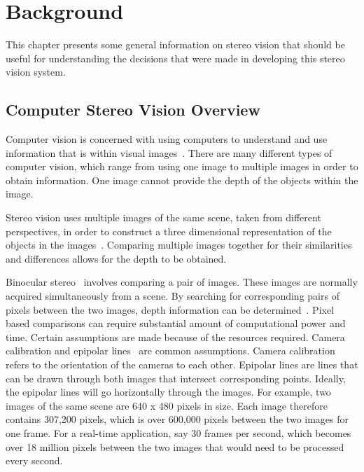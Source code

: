 \chapter{Background}
\label{bckgrnd}

This chapter presents some general information on stereo vision that should be useful for understanding the decisions that were made in developing this stereo vision system.

\section{Computer Stereo Vision Overview}

Computer vision is concerned with using computers to understand and use information that is within visual images~\cite{computerVision}. There are many different types of computer vision, which range from using one image to multiple images in order to obtain information. One image cannot provide the depth of the objects within the image.

Stereo vision uses multiple images of the same scene, taken from different perspectives, in order to construct a three dimensional representation of the objects in the images~\cite{stereoVision}. Comparing multiple images together for their similarities and differences allows for the depth to be obtained.

Binocular stereo~\cite{binocularStereo} involves comparing a pair of images. These images are normally acquired simultaneously from a scene. By searching for corresponding pairs of pixels between the two images, depth information can be determined~\cite{binocularStereo}. Pixel based comparisons can require substantial amount of computational power and time. Certain assumptions are made because of the resources required. Camera calibration and epipolar lines~\cite{binocularStereo} are common assumptions. Camera calibration refers to the orientation of the cameras to each other. Epipolar lines are lines that can be drawn through both images that intersect corresponding points. Ideally, the epipolar lines will go horizontally through the images. For example, two images of the same scene are 640 x 480 pixels in size. Each image therefore contains 307,200 pixels, which is over 600,000 pixels between the two images for one frame. For a real-time application, say 30 frames per second, which becomes over 18 million pixels between the two images that would need to be processed every second.

